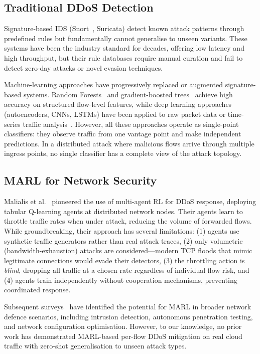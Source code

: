 \documentclass[sigconf,nonacm]{acmart}
\begin{document}
\subsection{Traditional DDoS Detection}

Signature-based IDS (Snort~\cite{roesch1999snort}, Suricata) detect known attack patterns through predefined rules but fundamentally cannot generalise to unseen variants. These systems have been the industry standard for decades, offering low latency and high throughput, but their rule databases require manual curation and fail to detect zero-day attacks or novel evasion techniques.

Machine-learning approaches have progressively replaced or augmented signature-based systems. Random Forests~\cite{breiman2001random} and gradient-boosted trees~\cite{ke2017lightgbm} achieve high accuracy on structured flow-level features, while deep learning approaches (autoencoders, CNNs, LSTMs) have been applied to raw packet data or time-series traffic analysis~\cite{mirsky2018kitsune}. However, all these approaches operate as single-point classifiers: they observe traffic from one vantage point and make independent predictions. In a distributed attack where malicious flows arrive through multiple ingress points, no single classifier has a complete view of the attack topology.

\subsection{MARL for Network Security}

Malialis et al.~\cite{malialis2015distributed} pioneered the use of multi-agent RL for DDoS response, deploying tabular Q-learning agents at distributed network nodes. Their agents learn to throttle traffic rates when under attack, reducing the volume of forwarded flows. While groundbreaking, their approach has several limitations: (1) agents use synthetic traffic generators rather than real attack traces, (2) only volumetric (bandwidth-exhaustion) attacks are considered---modern TCP floods that mimic legitimate connections would evade their detectors, (3) the throttling action is \emph{blind}, dropping all traffic at a chosen rate regardless of individual flow risk, and (4) agents train independently without cooperation mechanisms, preventing coordinated response.

Subsequent surveys~\cite{han2021marl} have identified the potential for MARL in broader network defence scenarios, including intrusion detection, autonomous penetration testing, and network configuration optimisation. However, to our knowledge, no prior work has demonstrated MARL-based per-flow DDoS mitigation on real cloud traffic with zero-shot generalisation to unseen attack types.
\end{document}
